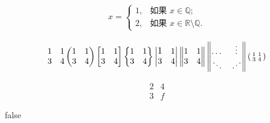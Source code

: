 \documentclass[12pt]{article} %
\newcommand{\adots}{\mathinner{\mkern2mu\raisebox{0.1em}{.}%
		\mkern2mu\raisebox{0.4em}{.}%
		\mkern2mu\raisebox{0.7em}{.}%
		\mkern1mu}}
\begin{document}
	\begin{equation}
	\begin{split}	%
	x =\begin{cases}
	1, & \text{如果 } x \in \mathbb{Q}; \\
	2, & \text{如果 } x \in \mathbb{R}\setminus\mathbb{Q}.
	\end{cases}
	\end{split}
	\end{equation}
	
	\[
		\begin{matrix}
		1 & 1 \\
		3 & 4
		\end{matrix}
		\begin{pmatrix}
		1 & 1 \\
		3 & 4
		\end{pmatrix}
		\begin{bmatrix}
		1 & 1 \\
		3 & 4
		\end{bmatrix}
		\begin{Bmatrix}
		1 & 1 \\
		3 & 4
		\end{Bmatrix}
		\begin{vmatrix}
		\text{\large 1} & 1 \\	%
		3 & 4
		\end{vmatrix}
		\begin{Vmatrix}
		1 & 1 \\
		3 & 4
		\end{Vmatrix}
		\begin{Vmatrix}
		\dots & \vdots \\
		\ddots & \adots	%
		\end{Vmatrix}
		\left(%
		\begin{smallmatrix}	%
		1 & 1 \\
		3 & 4
		\end{smallmatrix}
		\right)%
	\]
	
	\[
	\begin{array}{r|r}
	2 & 4\\
	\hline
	3 & f
	\end{array}
	\]
	
	
	\if false 
	\begin{thebibliography}{99}
		
	\end{thebibliography}
	\fi 
	
\end{document}
